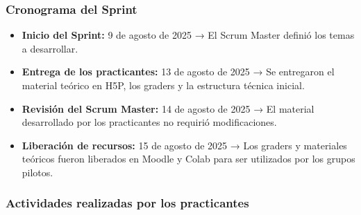 \documentclass[letter,oneside,12pt,spanish]{report}
\begin{document}
\subsubsection*{Cronograma del Sprint}
\begin{itemize}
	\item \textbf{Inicio del Sprint:} 9 de agosto de 2025 → El Scrum Master definió los temas a desarrollar.
	\item \textbf{Entrega de los practicantes:} 13 de agosto de 2025 → Se entregaron el material teórico en H5P, los graders y la estructura técnica inicial.
	\item \textbf{Revisión del Scrum Master:} 14 de agosto de 2025 → El material desarrollado por los practicantes no requirió modificaciones.
	\item \textbf{Liberación de recursos:} 15 de agosto de 2025 → Los graders y materiales teóricos fueron liberados en Moodle y Colab para ser utilizados por los grupos pilotos.
\end{itemize}

\subsubsection*{Actividades realizadas por los practicantes}
\end{document}
